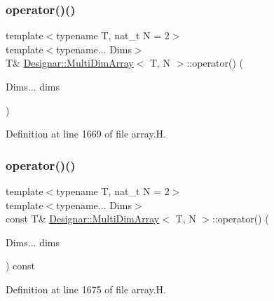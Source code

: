 \subsubsection{\texorpdfstring{operator()()}{operator()()}\hspace{0.1cm}{\footnotesize\ttfamily [1/2]}}
{\footnotesize\ttfamily template$<$typename T, nat\+\_\+t N = 2$>$ \\
template$<$typename... Dims$>$ \\
T\& \hyperlink{class_designar_1_1_multi_dim_array}{Designar\+::\+Multi\+Dim\+Array}$<$ T, N $>$\+::operator() (\begin{DoxyParamCaption}\item[{Dims...}]{dims }\end{DoxyParamCaption})\hspace{0.3cm}{\ttfamily [inline]}}



Definition at line 1669 of file array.\+H.

\mbox{\label{class_designar_1_1_multi_dim_array_a1edce0b31104f2b50bd8f8047e373b78}} 
\subsubsection{\texorpdfstring{operator()()}{operator()()}\hspace{0.1cm}{\footnotesize\ttfamily [2/2]}}
{\footnotesize\ttfamily template$<$typename T, nat\+\_\+t N = 2$>$ \\
template$<$typename... Dims$>$ \\
const T\& \hyperlink{class_designar_1_1_multi_dim_array}{Designar\+::\+Multi\+Dim\+Array}$<$ T, N $>$\+::operator() (\begin{DoxyParamCaption}\item[{Dims...}]{dims }\end{DoxyParamCaption}) const\hspace{0.3cm}{\ttfamily [inline]}}



Definition at line 1675 of file array.\+H.

\mbox{\label{class_designar_1_1_multi_dim_array_a4f191233c720bc670a181682b0452347}} 
